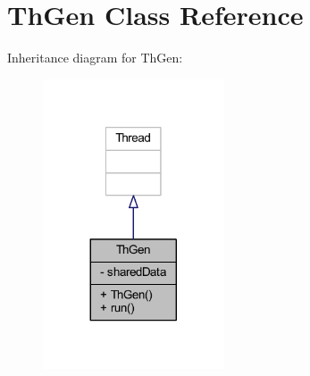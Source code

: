 \hypertarget{classmain_1_1_th_gen}{}\section{Th\+Gen Class Reference}
\label{classmain_1_1_th_gen}


Inheritance diagram for Th\+Gen\+:
\nopagebreak
\begin{figure}[H]
\begin{center}
\leavevmode
\includegraphics[width=152pt]{classmain_1_1_th_gen__inherit__graph}
\end{center}
\end{figure}


